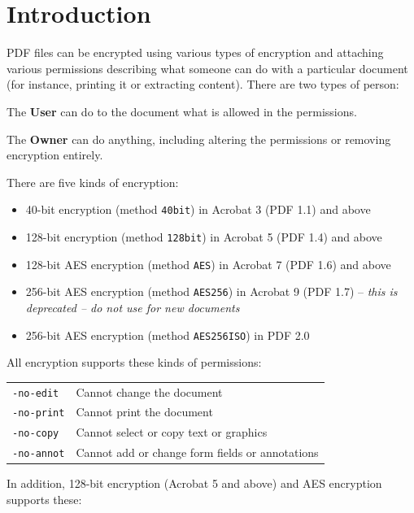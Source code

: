 \documentclass{book}
\begin{document}
  \section{Introduction}
  PDF files can be encrypted using various types of encryption and attaching
various permissions describing what someone can do with a particular document
(for instance, printing it or extracting content). There are two types of
person:
  \begin{description}
    \item The \textbf{User} can do to the document what is allowed in the permissions.
    \item The \textbf{Owner} can do anything, including altering the permissions or removing encryption entirely.
  \end{description}
  There are five kinds of encryption:
  \begin{itemize}
  \item 40-bit encryption (method \texttt{40bit}) in Acrobat 3 (PDF 1.1) and above
  \item 128-bit encryption (method \texttt{128bit}) in Acrobat 5 (PDF 1.4) and above
  \item 128-bit AES encryption (method \texttt{AES}) in Acrobat 7 (PDF 1.6) and above
  \item 256-bit AES encryption (method \texttt{AES256}) in Acrobat 9 (PDF 1.7) -- \textit{this is deprecated -- do not use for new documents}
  \item 256-bit AES encryption (method \texttt{AES256ISO}) in PDF 2.0
  \end{itemize}

   \vspace{2mm}
   \noindent All encryption supports these kinds of permissions:

   \vspace{2mm}
   \begin{tabular}{ll}
     \texttt{-no-edit} & Cannot change the document\\
     \texttt{-no-print} & Cannot print the document\\
     \texttt{-no-copy} & Cannot select or copy text or graphics\\
     \texttt{-no-annot} & Cannot add or change form fields or annotations\\
   \end{tabular}

   \vspace{2mm}
   \noindent In addition, 128-bit encryption (Acrobat 5 and above) and AES encryption supports these:
\end{document}
